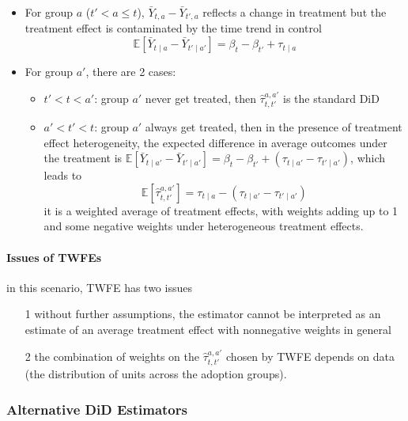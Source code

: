 \documentclass[twoside]{article}
\begin{document}
\begin{itemize}
    \item For group $a$ ($t'< a \leq t$), $\bar{Y}_{t,a}-\bar{Y}_{t',a}$ reflects a change in treatment but the treatment effect is contaminated by the time trend in control $$ \mathbb{E}\left[\bar{Y}_{t\mid a}-\bar{Y}_{t'\mid a'}\right] =\beta_t-\beta_{t'}+\tau_{t\mid a} $$
    \item For group $a'$, there are 2 cases:
    \begin{itemize}
        \item $t'<t<a'$: group $a'$ never get treated, then $\hat{\tau}^{a,a'}_{t,t'}$ is the standard DiD 
        \item $a'<t'<t$: group $a'$ always get treated, then in the presence of treatment effect heterogeneity, the expected difference in average outcomes under the treatment is $ \mathbb{E}\left[\bar{Y}_{t\mid a'}-\bar{Y}_{t'\mid a'}\right] = \beta_t - \beta_{t'} + \left(\tau_{t\mid a'}-\tau_{t'\mid a'}\right) $, which leads to $$ \mathbb{E}\left[\hat{\tau}^{a,a'}_{t,t'}\right] =\tau_{t\mid a} - \left(\tau_{t\mid a'}-\tau_{t'\mid a'}\right) $$ it is a weighted average of treatment effects, with weights adding up to 1 and some negative weights under heterogeneous treatment effects.
    \end{itemize}
\end{itemize}

\paragraph*{Issues of TWFEs} in this scenario, TWFE has two issues
\begin{itemize}
    \item[1] without further assumptions, the estimator cannot be interpreted as an estimate of an average treatment effect with nonnegative weights in general 
    \item[2] the combination of weights on the $\hat{\tau}^{a,a'}_{t,t'}$ chosen by TWFE depends on data (the distribution of units across the adoption groups).
\end{itemize}

\subsubsection{Alternative DiD Estimators}
\end{document}
